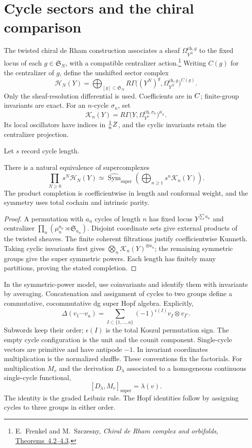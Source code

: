 \section{Cycle sectors and the chiral comparison}
\label{sec:zbps-cycle-states}

The twisted chiral de Rham construction associates a sheaf
\(\Omega_{Y^N}^{\mathrm{ch},g}\) to the fixed locus of each
\(g\in\mathfrak S_N\), with a compatible centralizer action.\footnote{
E.~Frenkel and M.~Szczesny, \emph{Chiral de Rham complex and
orbifolds}, \href{https://arxiv.org/abs/math/0307181}{Theorems~4.2--4.3}.}
Writing \(C(g)\) for the centralizer of \(g\), define the
unshifted sector complex
\[
 \mathcal H_N(Y)=\bigoplus_{[g]\subset\mathfrak S_N}
 R\Gamma\bigl((Y^N)^g,\Omega_{Y^N}^{\mathrm{ch},g}\bigr)^{C(g)}.
\]
Only the sheaf-resolution differential is used.  Coefficients are
in \(C\); finite-group invariants are exact.  For an \(n\)-cycle
\(\sigma_n\), set
\[
 \mathcal K_n(Y)=
 R\Gamma\bigl(Y,\Omega_{Y^n}^{\mathrm{ch},\sigma_n}\bigr)^{\mu_n}.
\]
Its local oscillators have indices in \(\tfrac1nZ\), and the
cyclic invariants retain the centralizer projection.

Let \(s\) record cycle length.
\begin{theorem}\label{thm:zbps-cycle-decomposition}
There is a natural equivalence of supercomplexes
\[
 \prod_{N\ge0}s^N\mathcal H_N(Y)
 \simeq\widehat{\operatorname{Sym}}_{\mathrm{super}}
       \left(\bigoplus_{n\ge1}s^n\mathcal K_n(Y)\right).
\]
The product completion is coefficientwise in length and conformal
weight, and the symmetry uses total cochain and intrinsic parity.
\end{theorem}
\begin{proof}
A permutation with \(a_n\) cycles of length \(n\) has fixed locus
\(Y^{\sum a_n}\) and centralizer
\(\prod_n(\mu_n^{a_n}\rtimes\mathfrak S_{a_n})\).
Disjoint coordinate sets give external products of the twisted
sheaves.  The finite coherent filtrations justify coefficientwise
Kunneth.  Taking cyclic invariants first gives
\(\bigotimes_n\mathcal K_n(Y)^{\otimes a_n}\); the remaining
symmetric groups give the super symmetric powers.  Each length
has finitely many partitions, proving the stated completion.
\end{proof}

In the symmetric-power model, use coinvariants and identify them
with invariants by averaging.  Concatenation and assignment of
cycles to two groups define a commutative, cocommutative dg super
Hopf algebra.  Explicitly,
\[
 \Delta(v_1\cdots v_a)=
 \sum_{I\subset\{1,\ldots,a\}}(-1)^{\epsilon(I)}v_I\otimes v_{I^c}.
\]
Subwords keep their order; \(\epsilon(I)\) is the total Koszul
permutation sign.  The empty cycle configuration is the unit and
the counit component.  Single-cycle vectors are primitive and
have antipode \(-1\).  In invariant coordinates multiplication
is the normalized shuffle.  These conventions fix the factorials.
For multiplication \(M_v\) and the derivation \(D_\lambda\)
associated to a homogeneous continuous single-cycle functional,
\[
 [D_\lambda,M_v]_{\mathrm{super}}=\lambda(v).
\]
The identity is the graded Leibniz rule.  The Hopf identities follow
by assigning cycles to three groups in either order.

